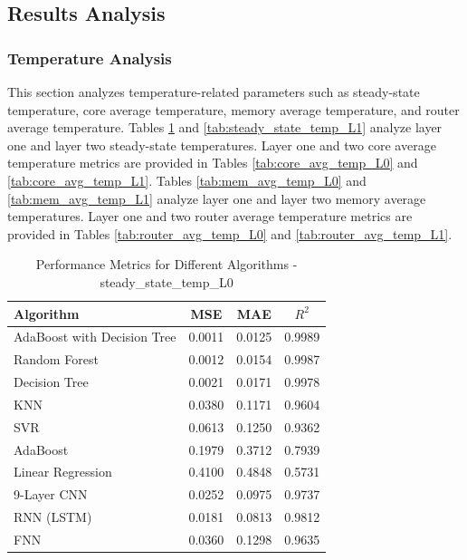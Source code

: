 \documentclass[conference]{IEEEtran}
\begin{document}
\subsection{Results Analysis}

	\subsubsection{Temperature Analysis}
	This section analyzes temperature-related parameters such as steady-state temperature, core average temperature, memory average temperature, and router average temperature. Tables \ref{tab:steady_state_temp_L0} and \ref{tab:steady_state_temp_L1} analyze layer one and layer two steady-state temperatures. Layer one and two core average temperature metrics are provided in Tables \ref{tab:core_avg_temp_L0} and \ref{tab:core_avg_temp_L1}. Tables \ref{tab:mem_avg_temp_L0} and \ref{tab:mem_avg_temp_L1} analyze layer one and layer two memory average temperatures. Layer one and two router average temperature metrics are provided in Tables \ref{tab:router_avg_temp_L0} and \ref{tab:router_avg_temp_L1}.


\begin{table}[htbp]
	\caption{Performance Metrics for Different Algorithms - steady\_state\_temp\_L0}
	\label{tab:steady_state_temp_L0}
	\begin{tabular}{lccc}
		\toprule
		\textbf{Algorithm} & \textbf{MSE} & \textbf{MAE} & \textbf{\(R^2\)} \\
		\midrule
		AdaBoost with Decision Tree & 0.0011 & 0.0125 & 0.9989 \\
		Random Forest & 0.0012 & 0.0154 & 0.9987 \\
		Decision Tree & 0.0021 & 0.0171 & 0.9978 \\
		KNN & 0.0380 & 0.1171 & 0.9604 \\
		SVR & 0.0613 & 0.1250 & 0.9362 \\
		AdaBoost & 0.1979 & 0.3712 & 0.7939 \\
		Linear Regression & 0.4100 & 0.4848 & 0.5731 \\
		9-Layer CNN        & 0.0252       & 0.0975       & 0.9737      \\ 
		RNN (LSTM)  & 0.0181       & 0.0813       & 0.9812      \\ 
		FNN                & 0.0360       & 0.1298       & 0.9635      \\ 
		\bottomrule
	\end{tabular}
\end{table}
\end{document}
